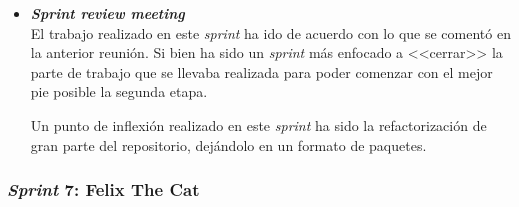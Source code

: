 \begin{itemize}
\item \textbf{\textit{Sprint review meeting}}\\
El trabajo realizado en este \textit{sprint} ha ido de acuerdo con lo que se comentó en la anterior reunión. Si bien ha sido un \textit{sprint} más enfocado a <<cerrar>> la parte de trabajo que se llevaba realizada para poder comenzar con el mejor pie posible la segunda etapa.

Un punto de inflexión realizado en este \textit{sprint} ha sido la refactorización de gran parte del repositorio, dejándolo en un formato de paquetes.
\end{itemize}

\subsubsection{\textit{Sprint} 7: Felix The Cat}
